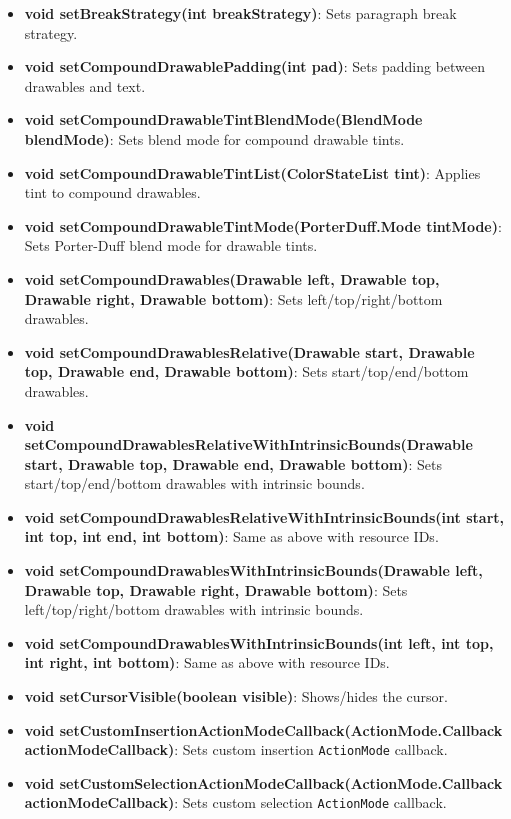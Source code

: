 \documentclass{report}
\begin{document}
\begin{itemize}
\begin{itemize}
                \item \textbf{void setBreakStrategy(int breakStrategy)}: Sets paragraph break strategy.
                \item \textbf{void setCompoundDrawablePadding(int pad)}: Sets padding between drawables and text.
                \item \textbf{void setCompoundDrawableTintBlendMode(BlendMode blendMode)}: Sets blend mode for compound drawable tints.
                \item \textbf{void setCompoundDrawableTintList(ColorStateList tint)}: Applies tint to compound drawables.
                \item \textbf{void setCompoundDrawableTintMode(PorterDuff.Mode tintMode)}: Sets Porter-Duff blend mode for drawable tints.
                \item \textbf{void setCompoundDrawables(Drawable left, Drawable top, Drawable right, Drawable bottom)}: Sets left/top/right/bottom drawables.
                \item \textbf{void setCompoundDrawablesRelative(Drawable start, Drawable top, Drawable end, Drawable bottom)}: Sets start/top/end/bottom drawables.
                \item \textbf{void setCompoundDrawablesRelativeWithIntrinsicBounds(Drawable start, Drawable top, Drawable end, Drawable bottom)}: Sets start/top/end/bottom drawables with intrinsic bounds.
                \item \textbf{void setCompoundDrawablesRelativeWithIntrinsicBounds(int start, int top, int end, int bottom)}: Same as above with resource IDs.
                \item \textbf{void setCompoundDrawablesWithIntrinsicBounds(Drawable left, Drawable top, Drawable right, Drawable bottom)}: Sets left/top/right/bottom drawables with intrinsic bounds.
                \item \textbf{void setCompoundDrawablesWithIntrinsicBounds(int left, int top, int right, int bottom)}: Same as above with resource IDs.
                \item \textbf{void setCursorVisible(boolean visible)}: Shows/hides the cursor.
                \item \textbf{void setCustomInsertionActionModeCallback(ActionMode.Callback actionModeCallback)}: Sets custom insertion \texttt{ActionMode} callback.
                \item \textbf{void setCustomSelectionActionModeCallback(ActionMode.Callback actionModeCallback)}: Sets custom selection \texttt{ActionMode} callback.

\end{itemize}
\end{itemize}
\end{document}
